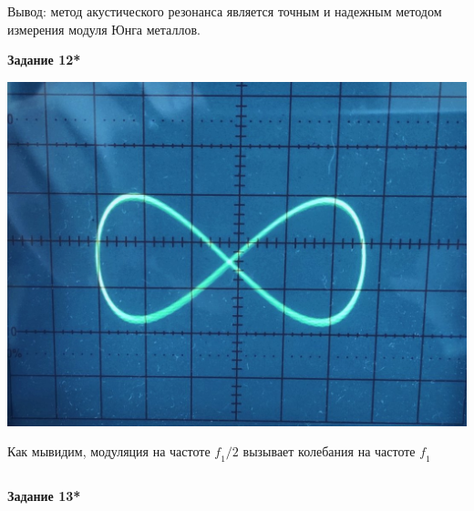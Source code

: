 \documentclass{article}
\begin{document}
\begin{equation*}
\end{equation*}

Вывод: метод акустического резонанса является точным и надежным методом измерения модуля Юнга металлов.

\newpage

\begin{center}
\textbf{Задание 12*}
\end{center}

\begin{minipage}[h]{0.44\linewidth}
\includegraphics[width=1\textwidth]{screen.jpg}
\end{minipage}
\begin{minipage}[h]{0.10\linewidth}
\end{minipage}
\begin{minipage}[h]{0.44\linewidth}
Как мывидим, модуляция на частоте $\textit{f}_1/2$ вызывает колебания на частоте $\textit{f}_1$
\end{minipage}

\begin{equation*}
\end{equation*}

\begin{center}
\textbf{Задание 13*}
\end{center}
\end{document}
